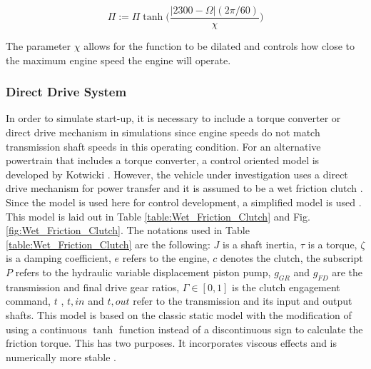 \begin{linenomath*}
    \begin{equation}\label{eq:throttle_taper}
        \Pi := \Pi\tanh\Bigg(\frac{|2300-\Omega|(2\pi/60)}{\chi}\Bigg)
    \end{equation}
\end{linenomath*}
The parameter $\chi$ allows for the function to be dilated and controls how close to the maximum engine speed the engine will operate.

\subsubsection{Direct Drive System}
In order to simulate start-up, it is necessary to include a torque converter or direct drive mechanism in simulations since engine speeds do not match transmission shaft speeds in this operating condition. For an alternative powertrain that includes a torque converter, a control oriented model is developed by Kotwicki \cite{kotwicki1982dynamic}. However, the vehicle under investigation uses a direct drive mechanism for power transfer and it is assumed to be a wet friction clutch \cite{buactuaucs2011automotive,deur2005modeling}. Since the model is used here for control development, a simplified model is used \cite{buactuaucs2011automotive}. This model is laid out in Table \ref{table:Wet_Friction_Clutch} and Fig. \ref{fig:Wet_Friction_Clutch}. The notations used in Table \ref{table:Wet_Friction_Clutch} are the following: $J$ is a shaft inertia, $\tau$ is a torque, $\zeta$ is a damping coefficient, $e$ refers to the engine, $c$ denotes the clutch, the subscript $P$ refers to the hydraulic variable displacement piston pump, $g_{GR}$ and $g_{FD}$ are the transmission and final drive gear ratios, $\Gamma \in [0,1]$ is the clutch engagement command, $t$ , $t,in$ and $t,out$ refer to the transmission and its input and output shafts. This model is based on the classic static model with the modification of using a continuous $\tanh$ function instead of a discontinuous sign to calculate the friction torque. This has two purposes. It incorporates viscous effects and is numerically more stable \cite{buactuaucs2011automotive}.
